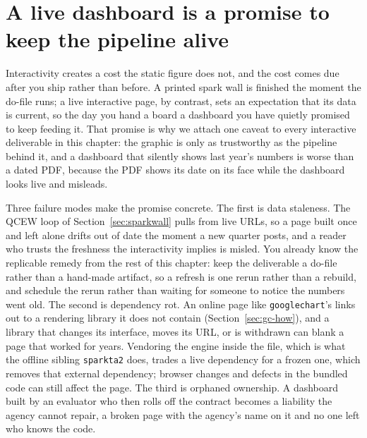 \documentclass[
    a4paper,
    fontsize=10pt,
    twoside=true,
    numbers=noenddot,
]{kaobook}
\begin{document}
\section{A live dashboard is a promise to keep the pipeline alive}\label{ch10-sec:maintenance}
Interactivity creates a cost the static figure does not, and the cost comes due after you ship rather than before. A printed spark wall is finished the moment the do-file runs; a live interactive page, by contrast, sets an expectation that its data is current, so the day you hand a board a dashboard you have quietly promised to keep feeding it. That promise is why we attach one caveat to every interactive deliverable in this chapter: the graphic is only as trustworthy as the pipeline behind it, and a dashboard that silently shows last year's numbers is worse than a dated PDF, because the PDF shows its date on its face while the dashboard looks live and misleads.

Three failure modes make the promise concrete. The first is data staleness. The QCEW loop of Section~\ref{sec:sparkwall} pulls from live URLs, so a page built once and left alone drifts out of date the moment a new quarter posts, and a reader who trusts the freshness the interactivity implies is misled. You already know the replicable remedy from the rest of this chapter: keep the deliverable a do-file rather than a hand-made artifact, so a refresh is one rerun rather than a rebuild, and schedule the rerun rather than waiting for someone to notice the numbers went old. The second is dependency rot. An online page like \texttt{googlechart}'s links out to a rendering library it does not contain (Section~\ref{sec:gc-how}), and a library that changes its interface, moves its URL, or is withdrawn can blank a page that worked for years. Vendoring the engine inside the file, which is what the offline sibling \texttt{sparkta2} does, trades a live dependency for a frozen one, which removes that external dependency; browser changes and defects in the bundled code can still affect the page. The third is orphaned ownership. A dashboard built by an evaluator who then rolls off the contract becomes a liability the agency cannot repair, a broken page with the agency's name on it and no one left who knows the code.
\end{document}
